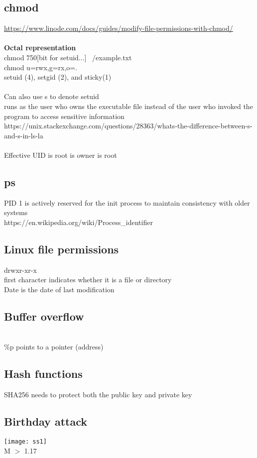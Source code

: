\documentclass[11pt]{article}
\begin{document}
\begin{multicols*}{3}
\subsection*{chmod}
\textcolor{link}{\url{https://www.linode.com/docs/guides/modify-file-permissions-with-chmod/}}\\\\
\textbf{Octal representation}\\
chmod 750[bit for setuid...] ~/example.txt\\
chmod u=rwx,g=rx,o=.\\
setuid (4), setgid (2), and sticky(1)\\
\\
Can also use s to denote setuid\\
runs as the user who owns the executable file instead of the user who invoked the program to access sensitive information\\
\textcolor{link}{https://unix.stackexchange.com/questions/28363/whats-the-difference-between-s-and-s-in-ls-la}\\\\
Effective UID is root is owner is root
\subsection*{ps}
PID 1 is actively reserved for the init process to maintain consistency with older systems\\
\textcolor{link}{https://en.wikipedia.org/wiki/Process\_identifier}\\
\subsection*{Linux file permissions}
drwxr-xr-x\\
first character indicates whether it is a file or directory\\
Date is the date of last modification
\subsection*{Buffer overflow}\\
\%p points to a pointer (address)\\
\subsection*{Hash functions}
SHA256 needs to protect both the public key and private key
\subsection*{Birthday attack}
\texttt{[image: ss1]}
\\
M $>$ 1.17 

\end{multicols*}
\end{document}

